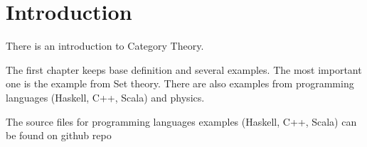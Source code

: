 \chapter*{Introduction}

There is an introduction to Category Theory. 

The first chapter keeps base definition and several examples. The most
important one is the example from Set theory. There are also examples
from programming languages (Haskell, C++, Scala) and physics.

The source files for programming languages examples (Haskell, C++,
Scala) can be found on github repo \cite{bib:github:ivanmurashko}

